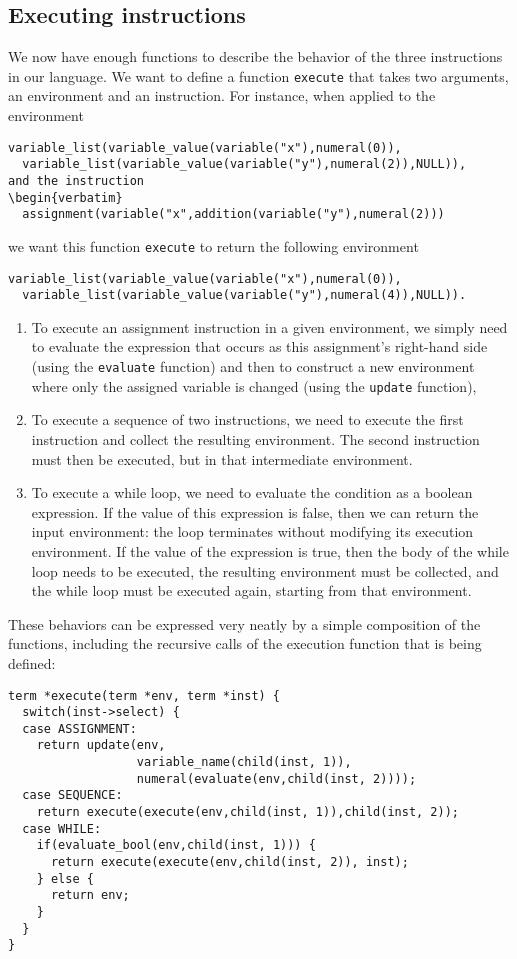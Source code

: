 \documentclass{book}
\begin{document}
\subsection{Executing instructions}
We now have enough functions to describe the behavior of the three instructions
in our language.  We want to define a function {\tt execute} that takes
two arguments, an environment and  an instruction.  For instance, when
applied to the environment
\begin{verbatim}
variable_list(variable_value(variable("x"),numeral(0)),
  variable_list(variable_value(variable("y"),numeral(2)),NULL)),
and the instruction
\begin{verbatim}
  assignment(variable("x",addition(variable("y"),numeral(2)))
\end{verbatim}
we want this function {\tt execute} to return the following environment
\begin{verbatim}
variable_list(variable_value(variable("x"),numeral(0)),
  variable_list(variable_value(variable("y"),numeral(4)),NULL)).
\end{verbatim}
\begin{enumerate}
\item To execute an assignment instruction in a given environment,
we simply need to evaluate the expression that occurs as this assignment's
right-hand side (using the {\tt evaluate} function) and then to
construct a new environment where only the assigned variable is changed
(using the {\tt update} function),
\item To execute a sequence of two instructions, we need to execute the
first instruction and collect the resulting environment.  The second
instruction must then be executed, but in that intermediate environment.
\item To execute a while loop, we need to evaluate the condition as
a boolean expression.  If the value of this expression is false, then
we can return the input environment: the loop terminates without modifying
its execution environment.  If the value of the expression is true, then
the body of the while loop needs to be executed, the resulting environment
must be collected, and the while loop must be executed again, starting
from that environment. 
\end{enumerate}
These behaviors can be expressed very neatly by a simple composition of
the functions, including the recursive calls of the execution function
that is being defined:
\begin{verbatim}
term *execute(term *env, term *inst) {
  switch(inst->select) {
  case ASSIGNMENT:
    return update(env, 
                  variable_name(child(inst, 1)),
                  numeral(evaluate(env,child(inst, 2))));
  case SEQUENCE:
    return execute(execute(env,child(inst, 1)),child(inst, 2));
  case WHILE:
    if(evaluate_bool(env,child(inst, 1))) {
      return execute(execute(env,child(inst, 2)), inst);
    } else {
      return env;
    }
  }
}
\end{verbatim}
\end{document}
